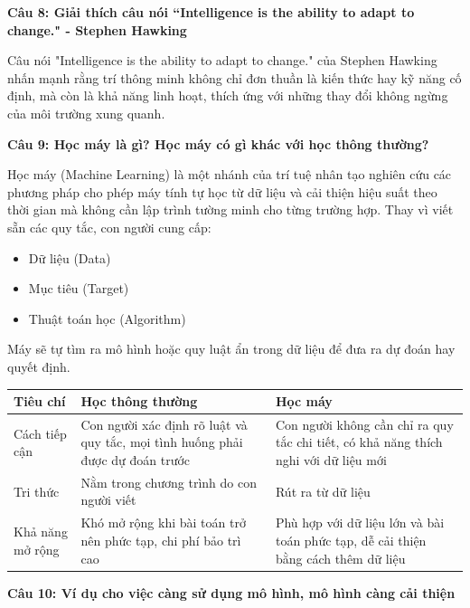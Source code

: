 \textbf{Câu 8: Giải thích câu nói “Intelligence is the ability to adapt to change." - Stephen Hawking}

Câu nói "Intelligence is the ability to adapt to change." của Stephen Hawking nhấn mạnh rằng trí thông minh không chỉ đơn thuần là kiến thức hay kỹ năng cố định, mà còn là khả năng linh hoạt, thích ứng với những thay đổi không ngừng của môi trường xung quanh.

\textbf{Câu 9: Học máy là gì? Học máy có gì khác với học thông thường?}

Học máy (Machine Learning) là một nhánh của trí tuệ nhân tạo nghiên cứu các phương pháp cho phép máy tính tự học từ dữ liệu và cải thiện hiệu suất theo thời gian mà không cần lập trình tường minh cho từng trường hợp. Thay vì viết sẵn các quy tắc, con người cung cấp: 
\begin{itemize}
	\item Dữ liệu (Data)
	
	\item Mục tiêu (Target)
	
	\item Thuật toán học (Algorithm)
\end{itemize}

Máy sẽ tự tìm ra mô hình hoặc quy luật ẩn trong dữ liệu để đưa ra dự đoán hay quyết định.

\begin{table}[H]
	\centering
	\begin{tabular}{|p{3cm}|p{4cm}|p{4cm}|}
		\hline
		Tiêu chí & Học thông thường & Học máy \\ \hline
		Cách tiếp cận & Con người xác định rõ luật và quy tắc, mọi tình huống phải được dự đoán trước & Con người không cần chỉ ra quy tắc chi tiết, có khả năng thích nghi với dữ liệu mới \\ \hline
		Tri thức & Nằm trong chương trình do con người viết & Rút ra từ dữ liệu \\ \hline
		Khả năng mở rộng & Khó mở rộng khi bài toán trở nên phức tạp, chi phí bảo trì cao & Phù hợp với dữ liệu lớn và bài toán phức tạp, dễ cải thiện bằng cách thêm dữ liệu \\ \hline
	\end{tabular}
\end{table}

\textbf{Câu 10: Ví dụ cho việc càng sử dụng mô hình, mô hình càng cải thiện}

